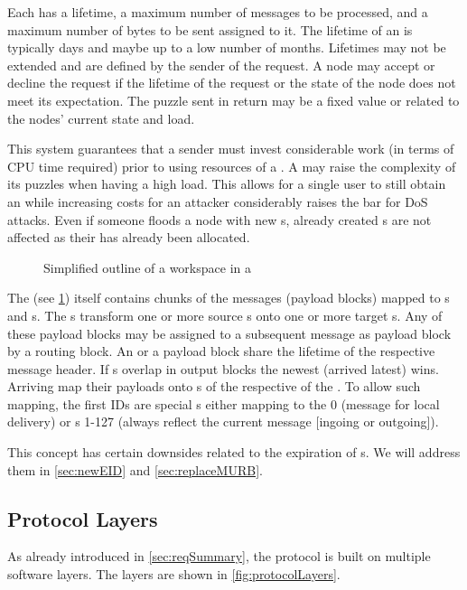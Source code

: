 Each  has a lifetime, a maximum number of messages to be processed, and a maximum number of bytes to be sent assigned to it. The lifetime of an  is typically days and maybe up to a low number of months. Lifetimes may not be extended and are defined by the sender of the request. A node may accept or decline the request if the lifetime of the request or the state of the node does not meet its expectation. The puzzle sent in return may be a fixed value or related to the nodes' current state and load.

This system guarantees that a sender must invest considerable work (in terms of CPU time required) prior to using resources of a \VortexNode. A \VortexNode{} may raise the complexity of its puzzles when having a high load. This allows for a single user to still obtain an  while increasing costs for an attacker considerably raises the bar for DoS attacks. Even if someone floods a node with new s, already created s are not affected as their  has already been allocated.

\begin{figure}[ht]
	\centering\resizebox{.95\linewidth}{!}{
		
	}
	\caption{Simplified outline of a workspace in a \VortexNode}
	\label{fig:workspace}
\end{figure}


The  (see \cref{fig:workspace}) itself contains chunks of the messages (payload blocks) mapped to s and s. The s transform one or more source s onto one or more target s. Any of these payload blocks may be assigned to a subsequent message as payload block by a routing block. An  or a payload block share the lifetime of the respective message header. If s overlap in output blocks the newest  (arrived latest) wins. Arriving \VortexMessages{} map their payloads onto s of the respective  of the . To allow such mapping, the first IDs are special s either mapping to the  0 (message for local delivery) or s 1-127 (always reflect the current message [ingoing or outgoing]).

This concept has certain downsides related to the expiration of s. We will address them in \cref{sec:newEID} and \ref{sec:replaceMURB}.

\subsection{Protocol Layers}
As already introduced in \cref{sec:reqSummary}, the protocol is built on multiple software layers. The layers are shown in \cref{fig:protocolLayers}.

